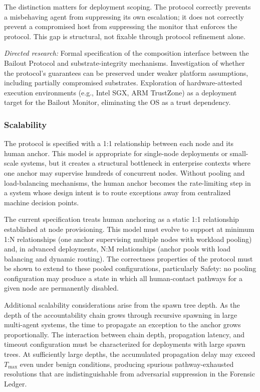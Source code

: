 The distinction matters for deployment scoping.  The protocol correctly
prevents a misbehaving agent from suppressing its own escalation; it does not
correctly prevent a compromised host from suppressing the monitor that enforces
the protocol.  This gap is structural, not fixable through protocol refinement
alone.

\textit{Directed research:} Formal specification of the composition interface
between the Bailout Protocol and substrate-integrity mechanisms.
Investigation of whether the protocol's guarantees can be preserved under
weaker platform assumptions, including partially compromised substrates.
Exploration of hardware-attested execution environments (e.g., Intel SGX,
ARM TrustZone) as a deployment target for the Bailout Monitor, eliminating
the OS as a trust dependency.

\subsubsection{Scalability}\label{sec:scalability}

The protocol is specified with a 1:1 relationship between each node and its
human anchor.  This model is appropriate for single-node deployments or
small-scale systems, but it creates a structural bottleneck in enterprise
contexts where one anchor may supervise hundreds of concurrent nodes.  Without
pooling and load-balancing mechanisms, the human anchor becomes the
rate-limiting step in a system whose design intent is to route exceptions away
from centralized machine decision points.

The current specification treats human anchoring as a static 1:1 relationship
established at node provisioning.  This model must evolve to support at minimum
1:N relationships (one anchor supervising multiple nodes with workload pooling)
and, in advanced deployments, N:M relationships (anchor pools with load
balancing and dynamic routing).  The correctness properties of the protocol
must be shown to extend to these pooled configurations, particularly Safety:
no pooling configuration may produce a state in which all human-contact
pathways for a given node are permanently disabled.

Additional scalability considerations arise from the spawn tree depth.  As the
depth of the accountability chain grows through recursive spawning in large
multi-agent systems, the time to propagate an exception to the anchor grows
proportionally.  The interaction between chain depth, propagation latency,
and timeout configuration must be characterized for deployments with large
spawn trees.  At sufficiently large depths, the accumulated propagation delay
may exceed $T_{\max}$ even under benign conditions, producing spurious
pathway-exhausted resolutions that are indistinguishable from adversarial
suppression in the Forensic Ledger.

